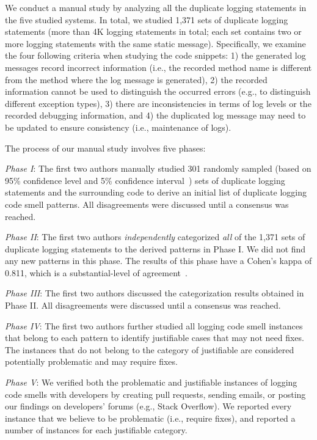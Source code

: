  We conduct a manual study by analyzing all the duplicate logging statements in the five studied systems. In total, we studied 1,371 sets of duplicate logging statements (more than 4K logging statements in total; each set contains two or more logging statements with the same static message). Specifically, we examine the four following criteria when studying the code snippets: 1) the generated log messages record incorrect information (i.e., the recorded method name is different from the method where the log message is generated), 2) the recorded information cannot be used to distinguish the occurred errors (e.g., to distinguish different exception types), 3) there are inconsistencies in terms of log levels or the recorded debugging information, and 4) the duplicated log message may need to be updated to ensure consistency (i.e., maintenance of logs).


\noindent The process of our manual study involves five phases:

{\em Phase I}: The first two authors manually studied 301 randomly sampled (based on 95\% confidence level and 5\% confidence interval~\cite{boslaugh2008statistics}) sets of duplicate logging statements and the surrounding code to derive an initial list of duplicate logging code smell patterns. All disagreements were discussed until a consensus was reached.

{\em Phase II}: The first two authors {\em independently} categorized {\em all} of the 1,371 sets of duplicate logging statements to the derived patterns in Phase I. We did not find any new patterns in this phase. The results of this phase have a Cohen’s kappa of 0.811, which is a substantial-level of agreement~\cite{kappa}.

{\em Phase III}: The first two authors discussed the categorization results obtained in Phase II. All disagreements were discussed until a consensus was reached.

{\em Phase IV}: The first two authors further studied all logging code smell instances that belong to each pattern to identify justifiable cases that may not need fixes. The instances that do not belong to the category of justifiable are considered potentially problematic and may require fixes.

{\em Phase V}: We verified both the problematic and justifiable instances of logging code smells with developers by creating pull requests, sending emails, or posting our findings on developers’ forums (e.g., Stack Overflow). We reported every instance that we believe to be problematic (i.e., require fixes), and reported a number of instances for each justifiable category.



